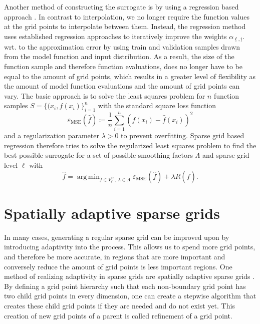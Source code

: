 \documentclass[
  a4paper,  %
  twoside,  %
  bibliography=totoc,
  headsepline,
  cleardoublepage=empty,
  parskip=half,
  draft=false
]{scrbook}
\DeclareMathOperator*{\argmin}{arg\,min}
\begin{document}
Another method of constructing the surrogate is by using a regression based approach \cite{}.
In contrast to interpolation, we no longer require the function values at the grid points to interpolate between them.
Instead, the regression method uses established regression approaches to iteratively improve the weights $\alpha_{\underline{\ell},\underline{i}}$. wrt. to the approximation error by using train and validation samples drawn from the model function and input distribution.
As a result, the size of the function sample and therefore function evaluations, does no longer have to be equal to the amount of grid points, which results in a greater level of flexibility as the amount of model function evaluations and the amount of grid points can vary.
The basic approach is to solve the least squares problem for $n$ function samples $S=\{(x_i, f(x_i)\}_{i=1}^n$ with the standard square loss function
\begin{equation}
\varepsilon_{\text{MSE}}(\hat{f}) \coloneqq \frac{1}{n} \sum_{i=1}^n (f(x_i) - \hat{f}(x_i))^2 
\end{equation}
and a regularization parameter $\lambda > 0$ to prevent overfitting.
Sparse grid based regression therefore tries to solve the regularized least squares problem to find the best possible surrogate for a set of possible smoothing factors $\Lambda$ and sparse grid level $\ell$ with
\begin{equation}
\hat{f} = \argmin_{\hat{f} \in V^{\text{sb}}_{\ell}, ~ \lambda \in \Lambda} \varepsilon_{\text{MSE}}(\hat{f}) + \lambda R(\hat{f}).
\end{equation}

\section{Spatially adaptive sparse grids}

In many cases, generating a regular sparse grid can be improved upon by introducing adaptivity into the process.
This allows us to spend more grid points, and therefore be more accurate, in regions that are more important and conversely reduce the amount of grid points is less important regions.
One method of realizing adaptivity in sparse grids are spatially adaptive sparse grids \cite{}.
By defining a grid point hierarchy such that each non-boundary grid point has two child grid points in every dimension, one can create a stepwise algorithm that creates these child grid points if they are needed and do not exist yet.
This creation of new grid points of a parent is called refinement of a grid point.
\end{document}
